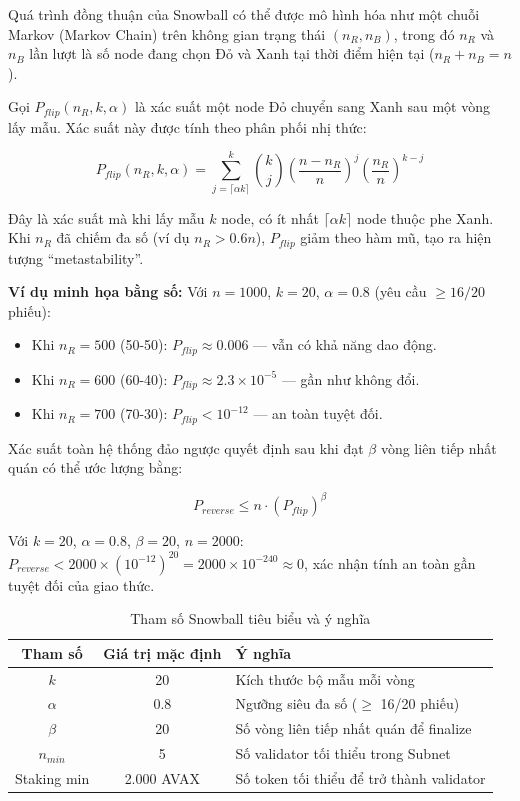 Quá trình đồng thuận của Snowball có thể được mô hình hóa như một chuỗi Markov (Markov Chain) trên không gian trạng thái $(n_R, n_B)$, trong đó $n_R$ và $n_B$ lần lượt là số node đang chọn Đỏ và Xanh tại thời điểm hiện tại ($n_R + n_B = n$).

Gọi $P_{flip}(n_R, k, \alpha)$ là xác suất một node Đỏ chuyển sang Xanh sau một vòng lấy mẫu. Xác suất này được tính theo phân phối nhị thức:

\begin{equation}
P_{flip}(n_R, k, \alpha) = \sum_{j=\lceil \alpha k \rceil}^{k} \binom{k}{j} \left(\frac{n - n_R}{n}\right)^{j} \left(\frac{n_R}{n}\right)^{k-j}
\label{eq:pflip}
\end{equation}

Đây là xác suất mà khi lấy mẫu $k$ node, có ít nhất $\lceil \alpha k \rceil$ node thuộc phe Xanh. Khi $n_R$ đã chiếm đa số (ví dụ $n_R > 0.6n$), $P_{flip}$ giảm theo hàm mũ, tạo ra hiện tượng ``metastability''.

\textbf{Ví dụ minh họa bằng số:} Với $n = 1000$, $k = 20$, $\alpha = 0.8$ (yêu cầu $\geq 16/20$ phiếu):
\begin{itemize}
    \item Khi $n_R = 500$ (50-50): $P_{flip} \approx 0.006$ --- vẫn có khả năng dao động.
    \item Khi $n_R = 600$ (60-40): $P_{flip} \approx 2.3 \times 10^{-5}$ --- gần như không đổi.
    \item Khi $n_R = 700$ (70-30): $P_{flip} < 10^{-12}$ --- an toàn tuyệt đối.
\end{itemize}

Xác suất toàn hệ thống đảo ngược quyết định sau khi đạt $\beta$ vòng liên tiếp nhất quán có thể ước lượng bằng:

\begin{equation}
P_{reverse} \leq n \cdot (P_{flip})^{\beta}
\label{eq:preverse}
\end{equation}

Với $k=20$, $\alpha=0.8$, $\beta=20$, $n=2000$: $P_{reverse} < 2000 \times (10^{-12})^{20} = 2000 \times 10^{-240} \approx 0$, xác nhận tính an toàn gần tuyệt đối của giao thức.

\begin{table}[H]
\centering
\caption{Tham số Snowball tiêu biểu và ý nghĩa}
\label{tab:snowball_params}
\begin{tabular}{|c|c|p{7cm}|}
\hline
\textbf{Tham số} & \textbf{Giá trị mặc định} & \textbf{Ý nghĩa} \\ \hline
$k$ & 20 & Kích thước bộ mẫu mỗi vòng \\ \hline
$\alpha$ & 0.8 & Ngưỡng siêu đa số ($\geq$ 16/20 phiếu) \\ \hline
$\beta$ & 20 & Số vòng liên tiếp nhất quán để finalize \\ \hline
$n_{min}$ & 5 & Số validator tối thiểu trong Subnet \\ \hline
Staking min & 2.000 AVAX & Số token tối thiểu để trở thành validator \\ \hline
\end{tabular}
\end{table}

